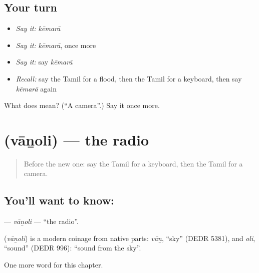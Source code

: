 \subsection*{Your turn}
\begin{itemize}
\raggedright
  \item \emph{Say it:} \emph{kēmarā}
  \item \emph{Say it:} \emph{kēmarā}, once more
  \item \emph{Say it:} say \emph{kēmarā}
  \item \emph{Recall:} say the Tamil for a flood, then the Tamil for a keyboard, then say \emph{kēmarā} again
\end{itemize}

\begin{tcolorbox}[breakable,colback=teal!4,colframe=teal!35!black,title={Before you move on}]
What does  mean? (\textquotedblleft{}A camera\textquotedblright{}.) Say it once more.
\end{tcolorbox}
\section[\texorpdfstring{\ta{வானொலி} (vāṉoli)}{வானொலி (vāṉoli)}]{ (vāṉoli) — the radio}

\label{lesson:TA-C220-vanoli}



\begin{quote}
Before the new one: say the Tamil for a keyboard, then the Tamil for a camera.
\end{quote}

\subsection*{You'll want to know: }
\textbf{} — \emph{vāṉoli} — \textquotedblleft{}the radio\textquotedblright{}.

\begin{cousinweb}
\textbf{} (\emph{vāṉoli}) is a modern coinage from native parts: \emph{vāṉ}, \textquotedblleft{}sky\textquotedblright{} (DEDR 5381), and \emph{oli}, \textquotedblleft{}sound\textquotedblright{} (DEDR 996): \textquotedblleft{}sound from the sky\textquotedblright{}.
\end{cousinweb}

\begin{grammarlens}[title={What you've built}]
One more word for this chapter.
\end{grammarlens}

